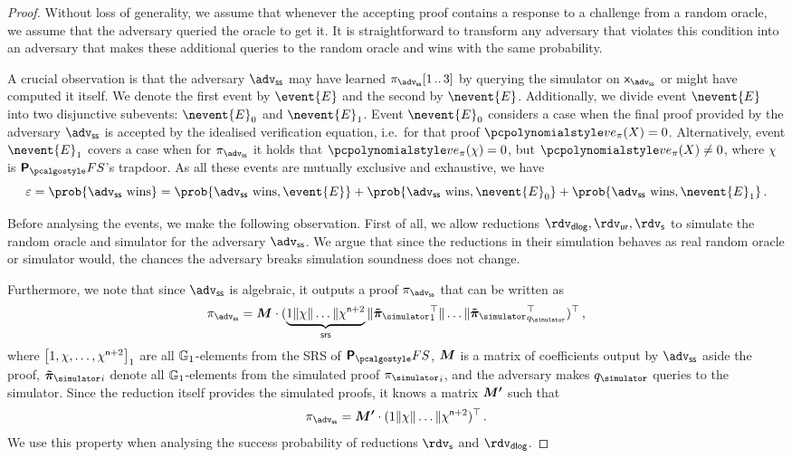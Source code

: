 \documentclass[runningheads,11pt]{llncs}
\def\vec#1{\mathchoice{\mbox{\boldmath$\displaystyle#1$}}
{\mbox{\boldmath$\textstyle#1$}} {\mbox{\boldmath$\scriptstyle#1$}}
{\mbox{\boldmath$\scriptscriptstyle#1$}}}
\theoremstyle{definition} \newtheorem{definition}[theorem]{Definition}
\begin{document}
\begin{proof}
  Without loss of generality, we assume that whenever the accepting proof
  contains a response to a challenge from a random oracle, we assume that the
  adversary queried the oracle to get it. It is straightforward to transform any
  adversary that violates this condition into an adversary that makes these
  additional queries to the random oracle and wins with the same probability.

  A crucial observation is that the adversary $\advss$ may have learned
  $\zkproof_{\advss}\range{1}{3}$ by querying the simulator on $\inp_{\advss}$
  or might have computed it itself. We denote the first event by $\event{E}$ and
  the second by $\nevent{E}$.
  Additionally, we divide event $\nevent{E}$ into two disjunctive subevents:
  $\nevent{E}_0$ and $\nevent{E}_1$. Event $\nevent{E}_0$ considers a case when
  the final proof provided by the adversary $\advss$ is accepted by the
  idealised verification equation, i.e.~for that proof $\vereq_\zkproof(X) = 0$.
  Alternatively, event $\nevent{E}_1$ covers a case when for $\zkproof_\advss$
  it holds that $\vereq_\zkproof(\chi) = 0$, but $\vereq_\zkproof(X) \neq 0$, where $\chi$ is
  $\plonkprotfs$'s trapdoor.
  As all these events are mutually exclusive and exhaustive, we have
  \[
    \eps = \prob{\advss \text{ wins}} = \prob{\advss \text{ wins}, \event{E}} +
    \prob{\advss \text{ wins}, \nevent{E}_0} + \prob{\advss \text{ wins},
      \nevent{E}_1}\,.
  \]

  Before analysing the events, we make the following observation. First of all,
  we allow reductions $\rdv_\dlog, \rdvur, \rdvs$ to simulate the random oracle
  and simulator for the adversary $\advss$. We argue that since the reductions
  in their simulation behaves as real random oracle or simulator would, the
  chances the adversary breaks simulation soundness does not change.

  Furthermore, we note that since $\advss$ is algebraic, it outputs a proof
  $\zkproof_\advss$ that can be written as
  \[
    \zkproof_\advss = \vec{M} \cdot (\underbrace{1 \| \chi \| \ldots \|
      \chi^{\noofc + 2}}_{\srs} \|
    \vec{\tilde{\zkproof}_\simulator}_1^{\top} \| \ldots \|
    \vec{\tilde{\zkproof}_\simulator}_{q_\simulator}^\top)^\top\,,
  \]
  where $\left[1, \chi, \ldots, \chi^{\mathsf{n} + 2}\right]_{1}$ are all
  $\mathbb{G}_1$-elements from the SRS of $\plonkprotfs$, $\vec{M}$ is a matrix of
  coefficients output by $\advss$ aside the proof,
  $\vec{\tilde{\zkproof}_\simulator}_i$ denote all $\mathbb{G}_1$-elements from the
  simulated proof ${\zkproof_\simulator}_i$, and the adversary makes
  $q_\simulator$ queries to the simulator.  Since the reduction itself provides
  the simulated proofs, it knows a matrix $\vec{M'}$ such that
  \begin{equation}
    \label{eq:M_prim}
    \zkproof_\advss = \vec{M'} \cdot (1 \| \chi \| \ldots \| \chi^{\noofc + 2})^\top\,.
  \end{equation}
  We use this property when analysing the success probability of reductions
  $\rdvs$ and $\rdvdlog$.


\end{proof}
\end{document}
